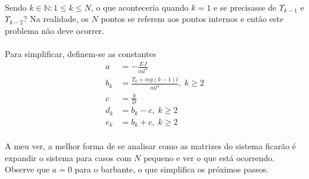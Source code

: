 \documentclass[a4paper,11pt]{scrartcl} %
\numberwithin{equation}{section} %
\numberwithin{figure}{section} %
\numberwithin{table}{section} %
\begin{document}
\paragraph{} Sendo $k\in \mathbb{N}:1\le k \le N$, o que aconteceria quando $k=1$ e se precisasse de $\Upsilon_{k-1}$ e $\Upsilon_{k-2}$? Na realidade, os $N$ pontos se referem aos pontos internos e então este problema não deve ocorrer.

\paragraph{} Para simplificar, definem-se as constantes \begin{align}
	a &= -\frac{EJ}{m l^4}\\
	b_k &= \frac{T_0 + mg(k-1)l}{m l^4},\; k\ge 2\\
	c &= \frac{g}{2l}\\
	d_k &= b_k - c,\; k\ge 2\\
	e_k &= b_k + c,\; k\ge 2
\end{align}

\paragraph{} A meu ver, a melhor forma de se analisar como as matrizes do sistema ficarão é expandir o sistema para casos com $N$ pequeno e ver o que está ocorrendo. Observe que $a=0$ para o barbante, o que simplifica os próximos passos.
\end{document}
